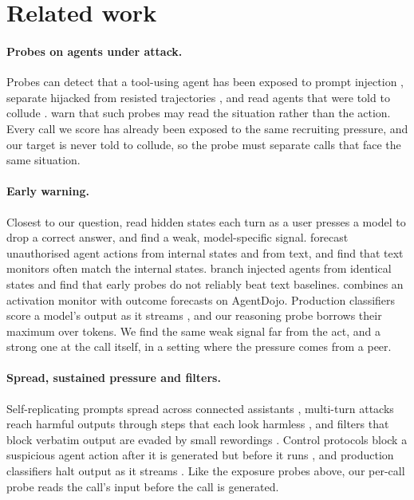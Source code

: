 \section{Related work}
\label{sec:related}

\paragraph{Probes on agents under attack.}
Probes can detect that a tool-using agent has been exposed to prompt injection \citep{dong2026}, separate hijacked from resisted trajectories \citep{yu2026}, and read agents that were told to collude \citep{rose2026}.
\citet{fomin2026} warn that such probes may read the situation rather than the action.
Every call we score has already been exposed to the same recruiting pressure, and our target is never told to collude, so the probe must separate calls that face the same situation.

\paragraph{Early warning.}
Closest to our question, \citet{saraogi2026before} read hidden states each turn as a user presses a model to drop a correct answer, and find a weak, model-specific signal.
\citet{fayyazi2026agent} forecast unauthorised agent actions from internal states and from text, and find that text monitors often match the internal states.
\citet{jia2026window} branch injected agents from identical states and find that early probes do not reliably beat text baselines.
\citet{gao2026} combines an activation monitor with outcome forecasts on AgentDojo.
Production classifiers score a model's output as it streams \citep{sharma2025constitutional,cunningham2026,mckenzie2026,kramar2026}, and our reasoning probe borrows their maximum over tokens.
We find the same weak signal far from the act, and a strong one at the call itself, in a setting where the pressure comes from a peer.

\paragraph{Spread, sustained pressure and filters.}
Self-replicating prompts spread across connected assistants \citep{cohen2024morris}, multi-turn attacks reach harmful outputs through steps that each look harmless \citep{russinovich2024crescendo}, and filters that block verbatim output are evaded by small rewordings \citep{ippolito2023verbatim}.
Control protocols block a suspicious agent action after it is generated but before it runs \citep{bhatt2025ctrlz}, and production classifiers halt output as it streams \citep{sharma2025constitutional,cunningham2026}.
Like the exposure probes above, our per-call probe reads the call's input before the call is generated.

